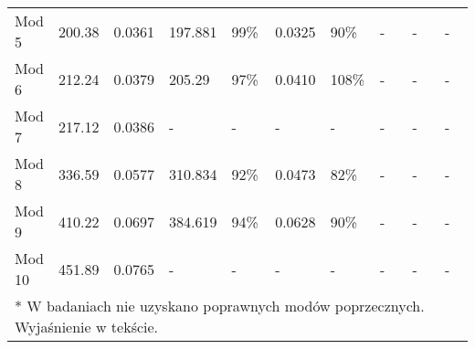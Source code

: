 \begin{table}[hbt!]
\begin{tabular}{@{}  P{0.08\linewidth} P{0.1\linewidth}  P{0.12\linewidth} | P{0.1\linewidth} P{0.1\linewidth} P{0.1\linewidth} P{0.11\linewidth} | P{0.1\linewidth} P{0.1\linewidth} P{0.09\linewidth} @{}}
			Mod 5 & 200.38                                                             & 0.0361                                                                 & 197.881           & 99\%              & 0.0325           & 90\%              & -                 & -                 & -           \\ %
			Mod 6   & 212.24                                                             & 0.0379                                                                 & 205.29            & 97\%              & 0.0410           & 108\%             & -                 & -                 & -            \\ %
		Mod 7  & 217.12                                                             & 0.0386                                                                 & -                 & -                 & -                & -                 & -                 & -                 & -           \\ %
		Mod 8  & 336.59                                                             & 0.0577                                                                 & 310.834           & 92\%              & 0.0473           & 82\%              & -                 & -                 & -            \\ %
			Mod 9   & 410.22                                                             & 0.0697                                                                 & 384.619           & 94\%              & 0.0628           & 90\%              & -                 & -                 & -            \\ %
			Mod 10  & 451.89                                                             & 0.0765                                                                 & -                 & -                 & -                & -                 & -                 & -                 & -            \\ \midrule %
			\multicolumn{10}{l}{
					* W badaniach nie uzyskano poprawnych modów poprzecznych. Wyjaśnienie w tekście. %
				}\\ \bottomrule
	\end{tabular}
\end{table}
